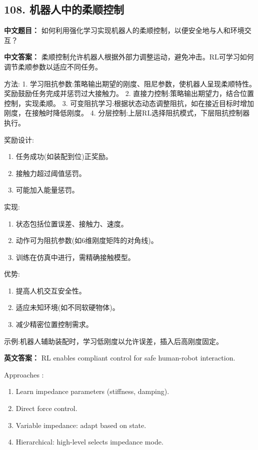 \documentclass[10pt,a4paper]{ctexart}
\begin{document}
\subsection*{108. 机器人中的柔顺控制}
\textbf{中文题目：} 如何利用强化学习实现机器人的柔顺控制，以便安全地与人和环境交互？

\textbf{中文答案：}  
柔顺控制允许机器人根据外部力调整运动，避免冲击。RL可学习如何调节柔顺参数以适应不同任务。

 方法:
1.  学习阻抗参数:策略输出期望的刚度、阻尼参数，使机器人呈现柔顺特性。奖励鼓励任务完成并惩罚过大接触力。
2.  直接力控制:策略输出期望力，结合位置控制，实现柔顺。
3.  可变阻抗学习:根据状态动态调整阻抗，如在接近目标时增加刚度，在接触时降低刚度。
4.  分层控制:上层RL选择阻抗模式，下层阻抗控制器执行。

 奖励设计:
\begin{enumerate}
    \item 任务成功(如装配到位)正奖励。
    \item 接触力超过阈值惩罚。
    \item 可能加入能量惩罚。
\end{enumerate}

 实现:
\begin{enumerate}
    \item 状态包括位置误差、接触力、速度。
    \item 动作可为阻抗参数(如6维刚度矩阵的对角线)。
    \item 训练在仿真中进行，需精确接触模型。
\end{enumerate}

 优势:
\begin{enumerate}
    \item 提高人机交互安全性。
    \item 适应未知环境(如不同软硬物体)。
    \item 减少精密位置控制需求。
\end{enumerate}

 示例:机器人辅助装配时，学习低刚度以允许误差，插入后高刚度固定。

\textbf{英文答案：}  
RL enables compliant control for safe human-robot interaction.

 Approaches :
\begin{enumerate}
    \item Learn impedance parameters (stiffness, damping).
    \item Direct force control.
    \item Variable impedance: adapt based on state.
    \item Hierarchical: high-level selects impedance mode.
\end{enumerate}
\end{document}
